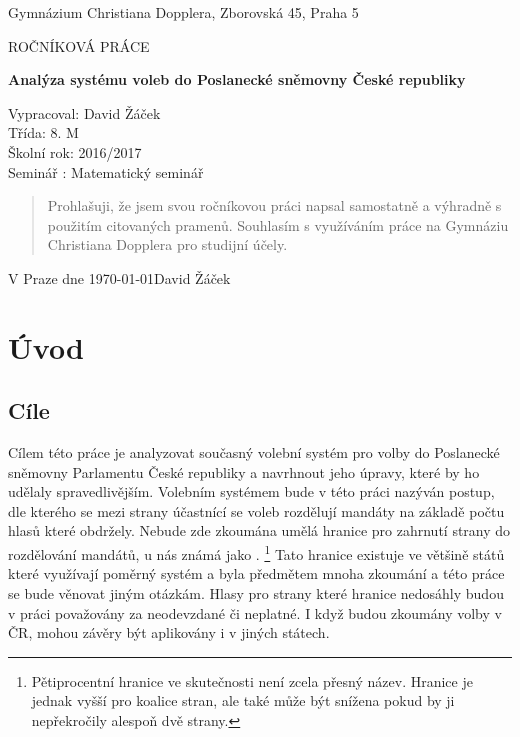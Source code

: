\documentclass[12pt]{report}
\begin{document}
\begin{titlepage}
	\begin{center}
	{\large Gymnázium Christiana Dopplera, Zborovská 45, Praha 5 \par}
	\vfill
	\par\vspace{1cm}
	{\scshape\LARGE ROČNÍKOVÁ PRÁCE \par}
	{\huge\bfseries Analýza systému voleb do Poslanecké sněmovny České republiky\par}
	\vfill
\end{center}
Vypracoval: David Žáček \\
Třída: 8. M \\
Školní rok: 2016/2017 \\
Seminář : Matematický seminář \\
	\vfill
\end{titlepage}

\vspace*{\fill}
\begin{quote}
Prohlašuji, že jsem svou ročníkovou práci napsal samostatně a výhradně s
použitím 
citovaných pramenů. Souhlasím s
využíváním 
práce na Gymnáziu Christiana Dopplera 
pro studijní účely. \\
\end{quote}

V Praze dne \today \hfill David Žáček

\vspace*{\fill}
\thispagestyle{empty}
\newpage
\tableofcontents
\newpage
\chapter{Úvod}
\section{Cíle} Cílem této práce je analyzovat současný volební systém pro volby do Poslanecké sněmovny Parlamentu České republiky a navrhnout jeho úpravy, které by ho udělaly spravedlivějším.
Volebním systémem bude v této práci nazýván postup, dle kterého se mezi strany účastnící se voleb rozdělují mandáty na základě počtu hlasů které obdržely.
Nebude zde zkoumána umělá hranice pro zahrnutí strany do rozdělování mandátů, u nás známá jako .
\footnote{Pětiprocentní hranice ve skutečnosti není zcela přesný název.
Hranice je jednak vyšší pro koalice stran, ale také může být snížena pokud by ji nepřekročily alespoň dvě strany.\autocite{ZAK}} Tato hranice existuje ve většině států které využívají poměrný systém a byla předmětem mnoha zkoumání a této práce se bude věnovat jiným otázkám.
Hlasy pro strany které hranice nedosáhly budou v práci považovány za neodevzdané či neplatné.
I když budou zkoumány volby v ČR, mohou závěry být aplikovány i v jiných státech.
\end{document}

